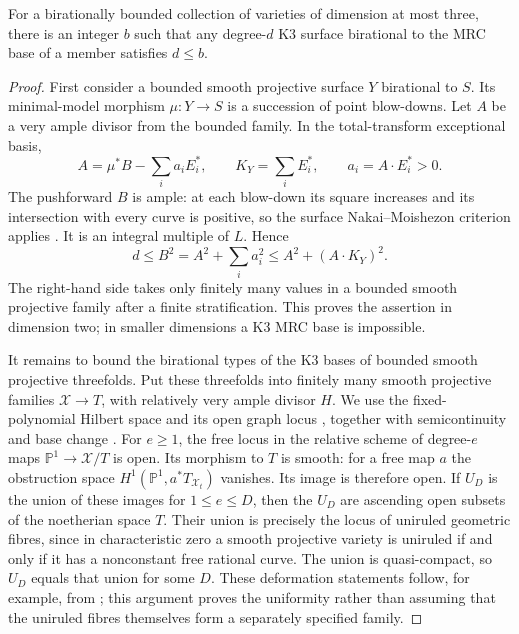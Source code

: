 \begin{lemma}
\label{bd:bounded-mrc}
For a birationally bounded collection of varieties of dimension at most
three, there is an integer $b$ such that any degree-$d$ K3 surface
birational to the MRC base of a member satisfies $d\leq b$.
\end{lemma}

\begin{proof}
First consider a bounded smooth projective surface $Y$ birational to
$S$.  Its minimal-model morphism $\mu:Y\to S$ is a succession of point
blow-downs.  Let $A$ be a very ample divisor from the bounded family.
In the total-transform exceptional basis,
\[
 A=\mu^*B-\sum_i a_iE_i^*,\qquad
 K_Y=\sum_iE_i^*,\qquad a_i=A\cdot E_i^*>0.
\]
The pushforward $B$ is ample: at each blow-down its square increases and
its intersection with every curve is positive, so the surface
Nakai--Moishezon criterion applies \cite[Theorem~1]{Cartier66}.  It is an integral multiple of $L$.
Hence
\begin{equation}\label{bd:surface-degree}
 d\leq B^2=A^2+\sum_i a_i^2
       \leq A^2+(A\cdot K_Y)^2.
\end{equation}
The right-hand side takes only finitely many values in a bounded smooth
projective family after a finite stratification.  This proves the
assertion in dimension two; in smaller dimensions a K3 MRC base is
impossible.

It remains to bound the birational types of the K3 bases of bounded
smooth projective threefolds.  Put these threefolds into finitely many
smooth projective families $\mathcal X\to T$, with relatively very ample
divisor $H$. We use the fixed-polynomial Hilbert space and its open
graph locus \cite[Tags~0DPH, 0D1A and~0D1B]{StacksProject057}, together with
semicontinuity and base change \cite[Tags~0BDN and~0B91]{StacksProject057}.
For $e\geq1$, the free locus in the relative scheme of
degree-$e$ maps $\mathbb P^1\to\mathcal X/T$ is open.  Its morphism to
$T$ is smooth: for a free map $a$ the obstruction space
$H^1(\mathbb P^1,a^*T_{\mathcal X_t})$ vanishes.  Its image is therefore
open.  If $U_D$ is the union of these images for $1\leq e\leq D$, then
the $U_D$ are ascending open subsets of the noetherian space $T$.
Their union is precisely the locus of uniruled geometric fibres, since
in characteristic zero a smooth projective variety is uniruled if and
only if it has a nonconstant free rational curve.  The union is
quasi-compact, so $U_D$ equals that union for some $D$.
These deformation statements follow, for example, from
\cite[Remark~9, Proposition~10 and Theorem~15]{AraujoKollar02}; this argument proves
the uniformity rather than assuming that the uniruled fibres themselves
form a separately specified family.


\end{proof}
